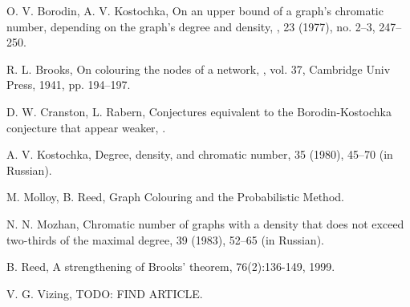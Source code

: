 \documentclass[12pt]{article}
\theoremstyle{definition}
\begin{document}
\begin{thebibliography}{1}

O. V. Borodin, A. V. Kostochka,
\newblock On an upper bound of a graph's chromatic number, depending on the graph's degree and density,
, 23 (1977), no. 2--3, 247--250.

R. L. Brooks,
\newblock On colouring the nodes of a network,
, 
vol. 37, Cambridge Univ Press, 1941, pp. 194--197.

D. W. Cranston, L. Rabern,
\newblock Conjectures equivalent to the Borodin-Kostochka conjecture that appear weaker,
.

A. V. Kostochka,
\newblock Degree, density, and chromatic number,
 35 (1980), 45--70 (in Russian).

M. Molloy, B. Reed,
\newblock Graph Colouring and the Probabilistic Method.

N. N. Mozhan,
\newblock Chromatic number of graphs with a density that does not exceed two-thirds of the maximal degree,
 39 (1983), 52--65 (in Russian).

B. Reed,
\newblock A strengthening of Brooks' theorem,
 76(2):136-149, 1999.

V. G. Vizing,
\newblock TODO: FIND ARTICLE.

\end{thebibliography}
\end{document}
